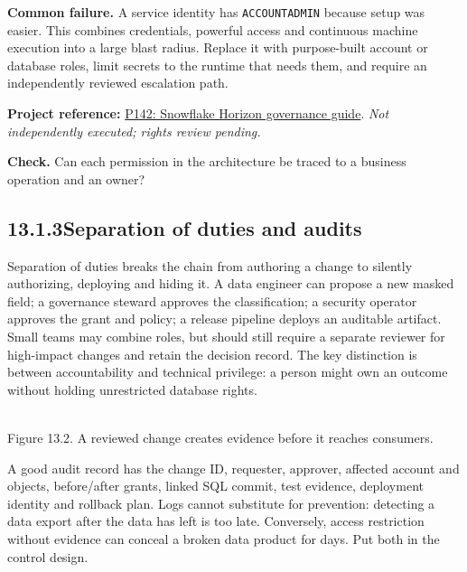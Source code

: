 \documentclass[11pt,twoside]{article}
\newcommand{\topic}[2]{\subsection*{#1\quad #2}}
\newcommand{\repo}[2]{\par\begingroup\fontsize{8.0}{9.6}\selectfont\sffamily\color{inkgray}\textbf{Project reference:} \href{#2}{#1}. \textit{Not independently executed; rights review pending.}\par\endgroup}
\begin{document}
\textbf{Common failure.} A service identity has \texttt{ACCOUNTADMIN} because setup was easier. This combines credentials, powerful access and continuous machine execution into a large blast radius. Replace it with purpose-built account or database roles, limit secrets to the runtime that needs them, and require an independently reviewed escalation path.
\repo{P142: Snowflake Horizon governance guide}{https://github.com/Snowflake-Labs/sfguide-getting-started-with-horizon-data-governance-in-snowflake}
\textbf{Check.} Can each permission in the architecture be traced to a business operation and an owner?
\newpage
\topic{13.1.3}{Separation of duties and audits}
Separation of duties breaks the chain from authoring a change to silently authorizing, deploying and hiding it. A data engineer can propose a new masked field; a governance steward approves the classification; a security operator approves the grant and policy; a release pipeline deploys an auditable artifact. Small teams may combine roles, but should still require a separate reviewer for high-impact changes and retain the decision record. The key distinction is between accountability and technical privilege: a person might own an outcome without holding unrestricted database rights.
\begin{center}\\{\fontsize{8}{9}\selectfont\color{inkgray}Figure 13.2. A reviewed change creates evidence before it reaches consumers.}\end{center}
A good audit record has the change ID, requester, approver, affected account and objects, before/after grants, linked SQL commit, test evidence, deployment identity and rollback plan. Logs cannot substitute for prevention: detecting a data export after the data has left is too late. Conversely, access restriction without evidence can conceal a broken data product for days. Put both in the control design.
\end{document}
